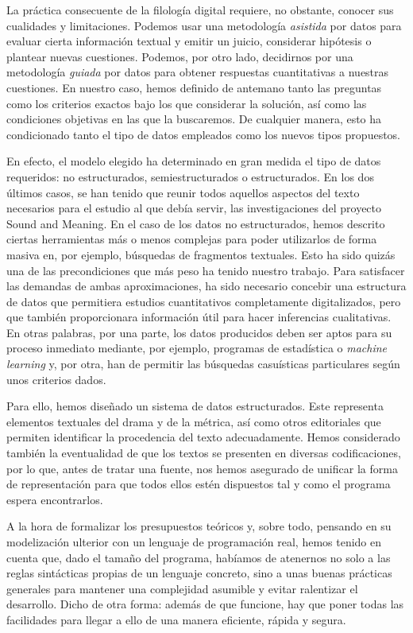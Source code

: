 La práctica consecuente de la filología digital requiere, no obstante, conocer sus cualidades y limitaciones. Podemos usar una metodología \textit{asistida} por datos para evaluar cierta información textual y emitir un juicio, considerar hipótesis o plantear nuevas cuestiones. Podemos, por otro lado, decidirnos por una metodología \textit{guiada} por datos para obtener respuestas cuantitativas a nuestras cuestiones. En nuestro caso, hemos definido de antemano tanto las preguntas como los criterios exactos bajo los que considerar la solución, así como las condiciones objetivas en las que la buscaremos. De cualquier manera, esto ha condicionado tanto el tipo de datos empleados como los nuevos tipos propuestos.

En efecto, el modelo elegido ha determinado en gran medida el tipo de datos requeridos: no estructurados, semiestructurados  o estructurados. En los dos últimos casos, se han tenido que reunir todos aquellos aspectos del texto necesarios para el estudio al que debía servir, las investigaciones del proyecto Sound and Meaning. En el caso de los datos no estructurados, hemos descrito ciertas herramientas más o menos complejas para poder utilizarlos de forma masiva en, por ejemplo, búsquedas de fragmentos textuales. Esto ha sido quizás una de las precondiciones que más peso ha tenido nuestro trabajo. Para satisfacer las demandas de ambas aproximaciones, ha sido necesario concebir una estructura de datos que permitiera estudios cuantitativos completamente digitalizados, pero que también proporcionara información útil para hacer inferencias cualitativas. En otras palabras, por una parte, los datos producidos deben ser aptos para su proceso inmediato mediante, por ejemplo, programas de estadística o \textit{machine learning} y, por otra, han de permitir las búsquedas casuísticas particulares según unos criterios dados.

Para ello, hemos diseñado un sistema de datos estructurados. Este representa elementos textuales del drama y de la métrica, así como otros editoriales que permiten identificar la procedencia del texto adecuadamente. Hemos considerado también la eventualidad de que los textos se presenten en diversas codificaciones, por lo que, antes de tratar una fuente, nos hemos asegurado de unificar la forma de representación para que todos ellos estén dispuestos tal y como el programa espera encontrarlos.

A la hora de formalizar los presupuestos teóricos y, sobre todo, pensando en su modelización ulterior con un lenguaje de programación real, hemos tenido en cuenta que, dado el tamaño del programa, habíamos de atenernos no solo a las reglas sintácticas propias de un lenguaje concreto, sino a unas buenas prácticas generales para mantener una complejidad asumible y evitar ralentizar el desarrollo. Dicho de otra forma: además de que funcione, hay que poner todas las facilidades para llegar a ello de una manera eficiente, rápida y segura.

